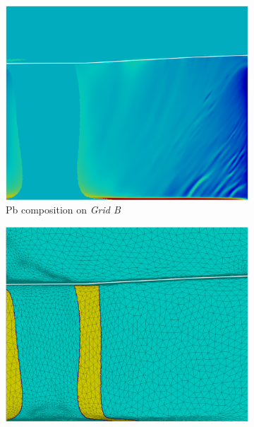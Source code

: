 \begin{figure}[htbp]
\begin{subfigure}[t]{0.15\textwidth}
  \end{subfigure}
  \begin{subfigure}[t]{0.4\textwidth}
    \centering
  \includegraphics[width=\textwidth]{Chapter5/Graphics/2d/processed/1700s_compobis.png}
  \caption{Pb composition on \emph{Grid B}}
    \label{fig:1700s_compobis}
  \end{subfigure}
   \vspace{5mm}
  \begin{subfigure}[t]{0.4\textwidth}
    \centering
  \includegraphics[width=\textwidth]{Chapter5/Graphics/2d/processed/1700s_unmask.png}

\end{subfigure}
\end{figure}
